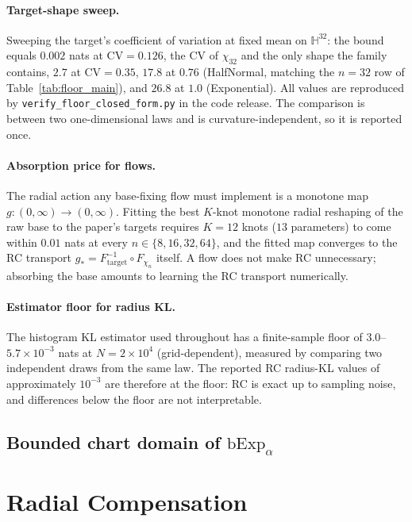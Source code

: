 \documentclass{article}
\theoremstyle{definition}
\theoremstyle{remark}
\newcommand{\bExp}{\mathrm{bExp}}
\newcommand{\HH}{\mathbb{H}}
\begin{document}
\paragraph{Target-shape sweep.} Sweeping the target's coefficient of variation at fixed mean on $\HH^{32}$: the bound equals $0.002$ nats at $\mathrm{CV}=0.126$, the CV of $\chi_{32}$ and the only shape the family contains, $2.7$ at $\mathrm{CV}=0.35$, $17.8$ at $0.76$ (HalfNormal, matching the $n{=}32$ row of Table~\ref{tab:floor_main}), and $26.8$ at $1.0$ (Exponential). All values are reproduced by \texttt{verify\_floor\_closed\_form.py} in the code release. The comparison is between two one-dimensional laws and is curvature-independent, so it is reported once.

\paragraph{Absorption price for flows.} The radial action any base-fixing flow must implement is a monotone map $g:(0,\infty)\to(0,\infty)$. Fitting the best $K$-knot monotone radial reshaping of the raw base to the paper's targets requires $K{=}12$ knots ($13$ parameters) to come within $0.01$ nats at every $n\in\{8,16,32,64\}$, and the fitted map converges to the RC transport $g_*=F_{\text{target}}^{-1}\!\circ F_{\chi_n}$ itself. A flow does not make RC unnecessary; absorbing the base amounts to learning the RC transport numerically.

\paragraph{Estimator floor for radius KL.} The histogram KL estimator used throughout has a finite-sample floor of $3.0$--$5.7\times10^{-3}$ nats at $N=2\times10^4$ (grid-dependent), measured by comparing two independent draws from the same law. The reported RC radius-KL values of approximately $10^{-3}$ are therefore at the floor: RC is exact up to sampling noise, and differences below the floor are not interpretable.

\subsection{Bounded chart domain of $\bExp_\alpha$}
\label{app:domain}


\section{Radial Compensation}
\label{sec:rc}
\end{document}
